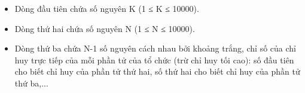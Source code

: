 \begin{itemize}
	\item Dòng đầu tiên chứa số nguyên K (1 ≤ K ≤ 10000).
	\item Dòng thứ hai chứa số nguyên N (1 ≤ N ≤ 10000).
	\item Dòng thứ ba chứa N-1 số nguyên cách nhau bởi khoảng trắng, chỉ số của chỉ huy trực tiếp của mỗi phần tử của tổ chức (trừ chỉ huy tối cao): số đầu tiên cho biết chỉ huy của phần tử thứ hai, số thứ hai cho biết chỉ huy của phần tử thứ ba,...
\end{itemize}

\